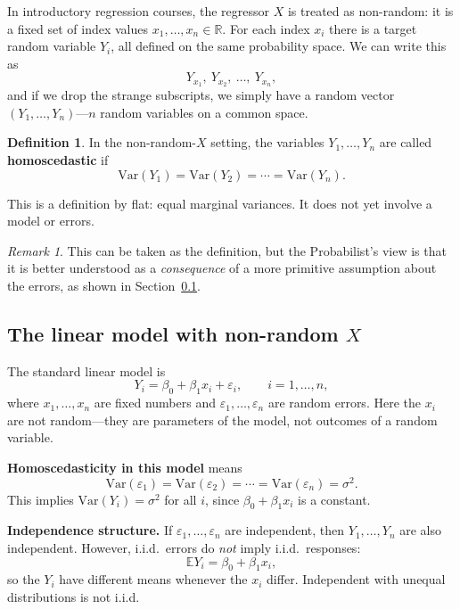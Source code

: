 \documentclass[a4paper,oneside,12pt]{extarticle}
\theoremstyle{plain}
\theoremstyle{definition}
\newtheorem{definition}[proposition]{Definition}
\theoremstyle{remark}
\newtheorem{remark}[proposition]{Remark}
\newcommand*{\E}{\mathbb{E}}
\newcommand*{\Var}{\mathrm{Var}}
\newcommand*{\mR}{\mathbb{R}}
\newcommand*{\ve}{\varepsilon}
\begin{document}
In introductory regression courses, the regressor $X$ is treated as
non-random: it is a fixed set of index values $x_1, \ldots, x_n \in \mR$.
For each index $x_i$ there is a target random variable $Y_i$, all defined
on the same probability space. We can write this as
\[
  Y_{x_1},\ Y_{x_2},\ \ldots,\ Y_{x_n},
\]
and if we drop the strange subscripts, we simply have a random vector
$(Y_1, \ldots, Y_n)$---$n$ random variables on a common space.

\begin{definition}
In the non-random-$X$ setting, the variables $Y_1, \ldots, Y_n$ are
called \textbf{homoscedastic} if
\[
  \Var(Y_1) = \Var(Y_2) = \cdots = \Var(Y_n).
\]
\end{definition}

This is a definition by flat: equal marginal variances. It does not yet
involve a model or errors.

\begin{remark}
This can be taken as the definition, but the Probabilist's view is that it is better
understood as a \emph{consequence} of a more primitive assumption about
the errors, as shown in Section~\ref{sec:linearnonrandom}.
\end{remark}

\subsection{The linear model with non-random $X$}
\label{sec:linearnonrandom}

The standard linear model is
\[
  Y_i = \beta_0 + \beta_1 x_i + \ve_i, \qquad i = 1,\ldots,n,
\]
where $x_1,\ldots,x_n$ are fixed numbers and $\ve_1,\ldots,\ve_n$ are
random errors. Here the $x_i$ are not random---they are parameters of
the model, not outcomes of a random variable.

\textbf{Homoscedasticity in this model} means
\[
  \Var(\ve_1) = \Var(\ve_2) = \cdots = \Var(\ve_n) = \sigma^2.
\]
This implies $\Var(Y_i) = \sigma^2$ for all $i$, since $\beta_0 + \beta_1 x_i$
is a constant.

\textbf{Independence structure.}
If $\ve_1,\ldots,\ve_n$ are independent, then $Y_1,\ldots,Y_n$ are also
independent. However, i.i.d.\ errors do \emph{not} imply i.i.d.\ responses:
\[
  \E Y_i = \beta_0 + \beta_1 x_i,
\]
so the $Y_i$ have different means whenever the $x_i$ differ. Independent
with unequal distributions is not i.i.d.
\end{document}
